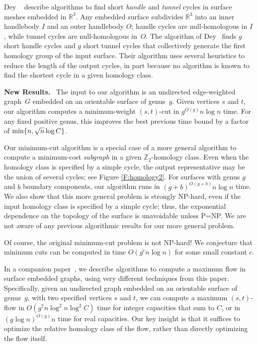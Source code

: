 \documentclass{sig-alternate}
\def\note#1{\EMPH{\color{red} #1}}
\def\Z{\mathbb{Z}}
\def\Real{\mathbb{R}}
\def\fakeparagraph#1{\medskip\noindent\textbf{#1}~}
\begin{document}
Dey \etal~\cite{dls-chtl-07, dlsc-cgaht-08} describe algorithms to find short \emph{handle} and \emph{tunnel} cycles in surface meshes embedded in $\Real^3$.  Any embedded surface subdivides $\Real^3$ into an inner handlebody $I$ and an outer handlebody $O$; handle cycles are null-homologous in $I$, while tunnel cycles are null-homologous in~$O$.  The algorithm of Dey \etal\ finds $g$ short handle cycles and $g$ short tunnel cycles that collectively generate the first homology group of the input surface.  Their algorithm uses several heuristics to reduce the length of the output cycles, in part because no algorithm is known to find the shortest cycle in a given homology class.

\fakeparagraph{New Results.}
The input to our algorithm is an undirected edge-weighted graph~$G$ embedded on an orientable surface of genus~$g$.  Given vertices $s$ and $t$, our algorithm computes a minimum-weight $(s,t)$-cut in $g^{O(g)}n\log n$ time.  For any fixed positive genus, this improves the best previous time bound by a factor of $\min\{ n, \sqrt{n}\log C \}$.

Our minimum-cut algorithm is a special case of a more general algorithm to compute a minimum-cost \emph{subgraph} in a given $\Z_2$-homology class.  Even when the homology class is specified by a simple cycle, the output representative may be the union of several cycles; see Figure \ref{F:homology2}.  For surfaces with genus $g$ and $b$ boundary components, our algorithm runs in $(g+b)^{O(g+b)}n\log n$ time.  We also show that this more general problem is strongly NP-hard, even if the input homology class is specified by a simple cycle; thus, the exponential dependence on the topology of the surface is unavoidable unless {P}={NP}.  We are not aware of any previous algorithmic results for our more general problem.

Of course, the original minimum-cut problem is not NP-hard!  We conjecture that minimum cuts can be computed in time $O(g^c n\log n)$ for some small constant $c$.




In a companion paper~\cite{cen-hfcc-09}, we describe algorithms to compute a maximum flow in surface embedded graphs, using very different techniques from this paper.  Specifically, given an undirected graph embedded on an orientable surface of genus~$g$, with two specified vertices $s$ and $t$, we can compute a maximum $(s,t)$-flow in $O(g^7 n\log^2 n\log^2 C)$ time for integer capacities that sum to $C$, or in $(g\log n)^{O(g)} n$ time for real capacities.  Our key insight is that it suffices to optimize the relative homology class of the flow, rather than directly optimizing the flow itself.
\end{document}
